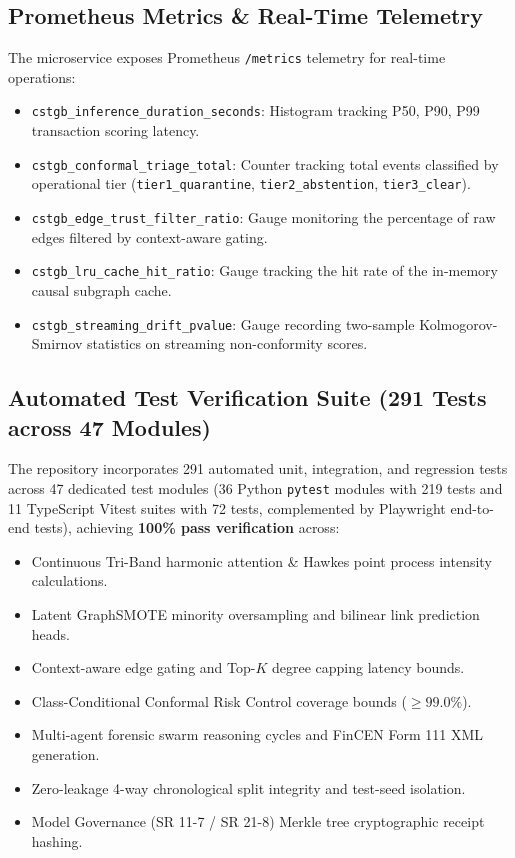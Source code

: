 \subsection{Prometheus Metrics \& Real-Time Telemetry}
The microservice exposes Prometheus \texttt{/metrics} telemetry for real-time operations:
\begin{itemize}
    \item \texttt{cstgb\_inference\_duration\_seconds}: Histogram tracking P50, P90, P99 transaction scoring latency.
    \item \texttt{cstgb\_conformal\_triage\_total}: Counter tracking total events classified by operational tier (\texttt{tier1\_quarantine}, \texttt{tier2\_abstention}, \texttt{tier3\_clear}).
    \item \texttt{cstgb\_edge\_trust\_filter\_ratio}: Gauge monitoring the percentage of raw edges filtered by context-aware gating.
    \item \texttt{cstgb\_lru\_cache\_hit\_ratio}: Gauge tracking the hit rate of the in-memory causal subgraph cache.
    \item \texttt{cstgb\_streaming\_drift\_pvalue}: Gauge recording two-sample Kolmogorov-Smirnov statistics on streaming non-conformity scores.
\end{itemize}

\subsection{Automated Test Verification Suite (291 Tests across 47 Modules)}
The repository incorporates 291 automated unit, integration, and regression tests across 47 dedicated test modules (36 Python \texttt{pytest} modules with 219 tests and 11 TypeScript Vitest suites with 72 tests, complemented by Playwright end-to-end tests), achieving \textbf{100\% pass verification} across:
\begin{itemize}
    \item Continuous Tri-Band harmonic attention \& Hawkes point process intensity calculations.
    \item Latent GraphSMOTE minority oversampling and bilinear link prediction heads.
    \item Context-aware edge gating and Top-$K$ degree capping latency bounds.
    \item Class-Conditional Conformal Risk Control coverage bounds ($\ge 99.0\%$).
    \item Multi-agent forensic swarm reasoning cycles and FinCEN Form 111 XML generation.
    \item Zero-leakage 4-way chronological split integrity and test-seed isolation.
    \item Model Governance (SR 11-7 / SR 21-8) Merkle tree cryptographic receipt hashing.
\end{itemize}

